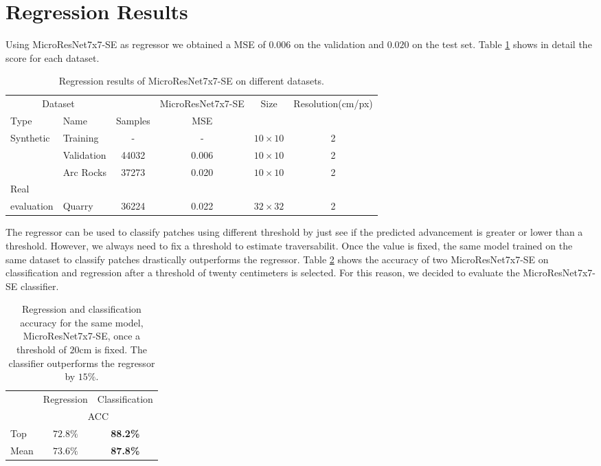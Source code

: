 \documentclass[../document.tex]{subfiles}
\begin{document}
\section{Regression Results}
Using MicroResNet7x7-SE as regressor we obtained a MSE of $0.006$ on the validation and $0.020$ on the test set. Table \ref{tab : regression-results} shows in detail the score for each dataset.
\begin{table}[htbp]
    \centering
    \begin{tabular}{@{}llcccc@{}}
    \toprule
    \multicolumn{2}{c}{Dataset} & & \multicolumn{1}{c}{MicroResNet7x7-SE} & Size & Resolution(cm/px) \\
    \cmidrule{1-2} \cmidrule{4-5}
    Type     &  Name  & Samples & MSE      & \\
    \toprule
      \multirow{3}{*}{Synthetic}  & Training  &  - & - &$10\times10$  & 2\\
      &  Validation   & 44032 &  0.006  &  $10\times10$ & 2 \\
      & Arc Rocks & 37273 & 0.020  &  $10\times10$& 2 \\
      \cmidrule{2-6}
    Real\\evaluation & Quarry & 36224 &  0.022 & $32\times32$ & 2\\
    \bottomrule   
\end{tabular}
\caption{Regression results of MicroResNet7x7-SE on different datasets.}
\label{tab : regression-results}
\end{table}
The regressor can be used to classify patches using different threshold by just see if the predicted advancement is greater or lower than a threshold. However, we always need to fix a threshold to estimate traversabilit. Once the value is fixed, the same model trained on the same dataset to classify patches drastically outperforms the regressor. Table \ref{tab : reg-clas} shows the accuracy of two MicroResNet7x7-SE on classification and regression after a threshold of twenty centimeters is selected. For this reason, we decided to evaluate the MicroResNet7x7-SE classifier.
\begin{table}[htbp]
  \centering
  \begin{tabular}{@{}lcc@{}}
  \toprule
  &  Regression & Classification  \\
 & \multicolumn{2}{c}{ACC} \\ 
  \cline{2-3}
   Top & $72.8\%$ & \textbf{88.2\%} \\
   Mean & $73.6\%$ & \textbf{87.8\%} \\
  \bottomrule   
\end{tabular}
\caption{Regression and classification accuracy for the same model,  MicroResNet7x7-SE, once a threshold of $20$cm is fixed. The classifier outperforms the regressor by $15\%$.}
\label{tab : reg-clas}
\end{table}
\end{document}
